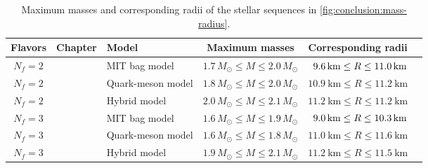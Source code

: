 \begin{table}[p]
\centering
\caption{\label{tab:master_conclusion:results}%
Maximum masses and corresponding radii of the stellar sequences in \cref{fig:conclusion:mass-radius}.
}
{\setlength{\tabcolsep}{4pt} %
\begin{tabular}{ c l l c c c }
	\toprule
	Flavors & Chapter & Model & Maximum masses & Corresponding radii                            \\
	\midrule
	$N_f=2$ & \Cref{chap:mit} & MIT bag model & $1.7 \, M_\odot \leq M \leq 2.0 \, M_\odot$ & $\hphantom{1}\SI{9.6}{\kilo\meter} \leq R \leq \SI{11.0}{\kilo\meter}$ \\
	$N_f=2$ & \Cref{chap:lsm2f} & Quark-meson model & $1.8 \, M_\odot \leq M \leq 2.0 \, M_\odot$ & $\SI{10.9}{\kilo\meter} \leq R \leq \SI{11.2}{\kilo\meter}$ \\
	$N_f=2$ & \Cref{chap:hybrid} & Hybrid model & $2.0 \, M_\odot \leq M \leq 2.1 \, M_\odot$ & $\SI{11.2}{\kilo\meter} \leq R \leq \SI{11.2}{\kilo\meter}$ \\
	\midrule
	$N_f=3$ & \Cref{chap:mit} & MIT bag model & $1.6 \, M_\odot \leq M \leq 1.9 \, M_\odot$ & $\hphantom{1}\SI{9.0}{\kilo\meter} \leq R \leq \SI{10.3}{\kilo\meter}$ \\
	$N_f=3$ & \Cref{chap:lsm3f} & Quark-meson model & $1.6 \, M_\odot \leq M \leq 1.8 \, M_\odot$ & $\SI{11.0}{\kilo\meter} \leq R \leq \SI{11.6}{\kilo\meter}$ \\
	$N_f=3$ & \Cref{chap:hybrid} & Hybrid model & $1.9 \, M_\odot \leq M \leq 2.1 \, M_\odot$ & $\SI{11.2}{\kilo\meter} \leq R \leq \SI{11.5}{\kilo\meter}$ \\
	\bottomrule
\end{tabular}}
\end{table}

